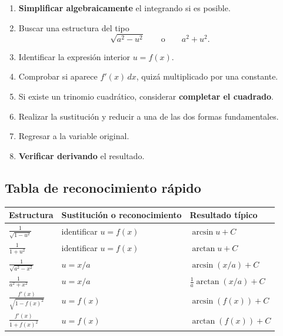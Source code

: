 \documentclass[12pt]{article}
\theoremstyle{definition}
\theoremstyle{remark}
\begin{document}
\begin{enumerate}
\item \textbf{Simplificar algebraicamente} el integrando si es posible.
\item Buscar una estructura del tipo
\[
\sqrt{a^2-u^2}
\qquad\text{o}\qquad
a^2+u^2.
\]
\item Identificar la expresión interior $u=f(x)$.
\item Comprobar si aparece $f'(x)\,dx$, quizá multiplicado por una constante.
\item Si existe un trinomio cuadrático, considerar \textbf{completar el cuadrado}.
\item Realizar la sustitución y reducir a una de las dos formas fundamentales.
\item Regresar a la variable original.
\item \textbf{Verificar derivando} el resultado.
\end{enumerate}

\subsection*{Tabla de reconocimiento rápido}

\begin{center}
\renewcommand{\arraystretch}{1.6}
\begin{tabular}{>{\centering\arraybackslash}p{}
                >{\centering\arraybackslash}p{}
                >{\centering\arraybackslash}p{}}
\toprule
\textbf{Estructura} & \textbf{Sustitución o reconocimiento} & \textbf{Resultado típico}\\
\midrule
$\displaystyle \frac{1}{\sqrt{1-u^2}}$
& identificar $u=f(x)$
& $\arcsin u+C$\\
$\displaystyle \frac{1}{1+u^2}$
& identificar $u=f(x)$
& $\arctan u+C$\\
$\displaystyle \frac{1}{\sqrt{a^2-x^2}}$
& $u=x/a$
& $\arcsin(x/a)+C$\\
$\displaystyle \frac{1}{a^2+x^2}$
& $u=x/a$
& $\frac1a\arctan(x/a)+C$\\
$\displaystyle \frac{f'(x)}{\sqrt{1-f(x)^2}}$
& $u=f(x)$
& $\arcsin(f(x))+C$\\
$\displaystyle \frac{f'(x)}{1+f(x)^2}$
& $u=f(x)$
& $\arctan(f(x))+C$\\
\bottomrule
\end{tabular}
\end{center}

\end{document}
